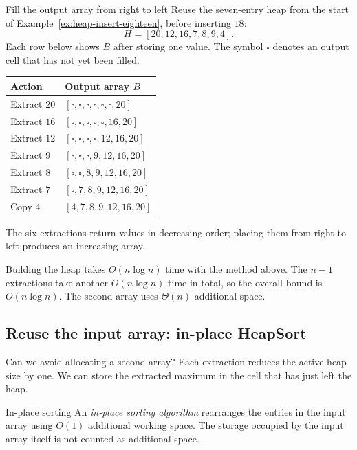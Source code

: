 \documentclass[a4paper,12pt,oneside]{report}
\begin{document}
\begin{framedexample}{Fill the output array from right to left}
Reuse the seven-entry heap from the start of
Example~\ref{ex:heap-insert-eighteen}, before inserting $18$:
\[
H=[20,12,16,7,8,9,4].
\]
Each row below shows $B$ after storing one value.
The symbol $\square$ denotes an output cell that has not yet been filled.
\begin{center}
\small
\begin{tabular}{ll}
\hline
Action & Output array $B$ \\
\hline
Extract $20$ & $[\square,\square,\square,\square,\square,\square,20]$ \\
Extract $16$ & $[\square,\square,\square,\square,\square,16,20]$ \\
Extract $12$ & $[\square,\square,\square,\square,12,16,20]$ \\
Extract $9$  & $[\square,\square,\square,9,12,16,20]$ \\
Extract $8$  & $[\square,\square,8,9,12,16,20]$ \\
Extract $7$  & $[\square,7,8,9,12,16,20]$ \\
Copy $4$    & $[4,7,8,9,12,16,20]$ \\
\hline
\end{tabular}
\end{center}
The six extractions return values in decreasing order; placing
them from right to left produces an increasing array.
\end{framedexample}

Building the heap takes $O(n\log n)$ time with the method above.
The $n-1$ extractions take another $O(n\log n)$ time in total,
so the overall bound is $O(n\log n)$. The second array uses
$\Theta(n)$ additional space.

\subsection{Reuse the input array: in-place HeapSort}

Can we avoid allocating a second array? Each extraction reduces
the active heap size by one. We can store the extracted maximum
in the cell that has just left the heap.

\begin{frameddefn}{In-place sorting}
An \emph{in-place sorting algorithm} rearranges the entries in
the input array using $O(1)$ additional working space.
The storage occupied by the input array itself is not counted
as additional space.
\end{frameddefn}
\end{document}
